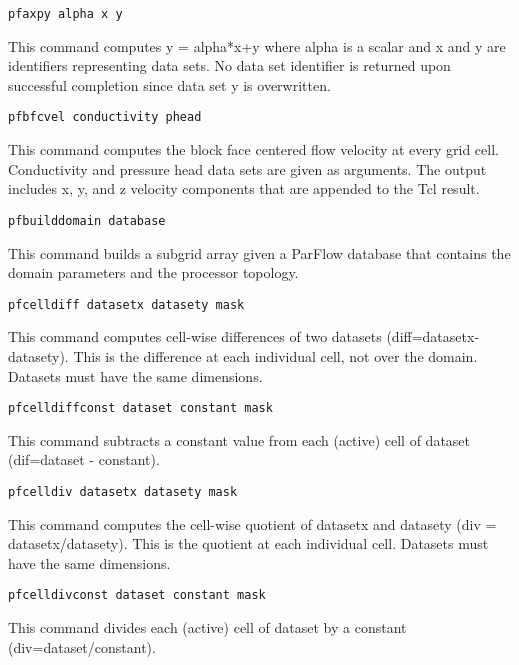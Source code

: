 \begin{description}

\item{\begin{verbatim}pfaxpy alpha x y\end{verbatim}}
This command computes y = alpha*x+y where alpha is a scalar and x and y are identifiers
representing data sets. No data set identifier is returned upon successful completion
since data set y is overwritten.

\item{\begin{verbatim}pfbfcvel conductivity phead\end{verbatim}}
This command computes the block face centered flow velocity at every grid cell.
Conductivity and pressure head data sets are given as arguments.
The output includes x, y, and z velocity components that are appended to the Tcl result.

\item{\begin{verbatim}pfbuilddomain database\end{verbatim}}
This command builds a subgrid array given a ParFlow database that contains the domain
parameters and the processor topology.

\item{\begin{verbatim}pfcelldiff datasetx datasety mask\end{verbatim}}
This command computes cell-wise differences of two datasets (diff=datasetx-datasety).
This is the difference at each individual cell, not over the domain. Datasets must have the same dimensions.

\item{\begin{verbatim}pfcelldiffconst dataset constant mask\end{verbatim}}
This command subtracts a constant value from each (active) cell of dataset (dif=dataset - constant).

\item{\begin{verbatim}pfcelldiv datasetx datasety mask\end{verbatim}}
This command computes the cell-wise quotient of datasetx and datasety (div = datasetx/datasety).
This is the quotient at each individual cell. Datasets must have the same dimensions.

\item{\begin{verbatim}pfcelldivconst dataset constant mask\end{verbatim}}
This command divides each (active) cell of dataset by a constant (div=dataset/constant).


\end{description}
